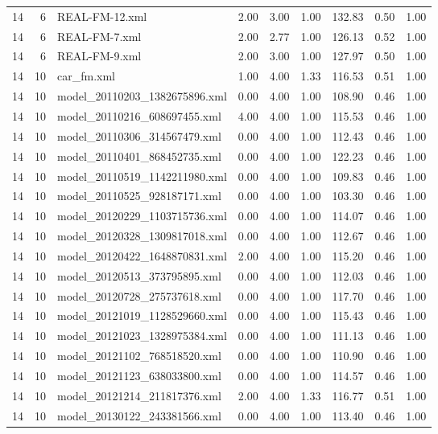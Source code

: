 \begin{table}[ht]
\begin{tabular}{rrlrrrrrr}
   14 &   6 & REAL-FM-12.xml & 2.00 & 3.00 & 1.00 & 132.83 & 0.50 & 1.00 \\ 
   14 &   6 & REAL-FM-7.xml & 2.00 & 2.77 & 1.00 & 126.13 & 0.52 & 1.00 \\ 
   14 &   6 & REAL-FM-9.xml & 2.00 & 3.00 & 1.00 & 127.97 & 0.50 & 1.00 \\ 
   14 &  10 & car\_fm.xml & 1.00 & 4.00 & 1.33 & 116.53 & 0.51 & 1.00 \\ 
   14 &  10 & model\_20110203\_1382675896.xml & 0.00 & 4.00 & 1.00 & 108.90 & 0.46 & 1.00 \\ 
   14 &  10 & model\_20110216\_608697455.xml & 4.00 & 4.00 & 1.00 & 115.53 & 0.46 & 1.00 \\ 
   14 &  10 & model\_20110306\_314567479.xml & 0.00 & 4.00 & 1.00 & 112.43 & 0.46 & 1.00 \\ 
   14 &  10 & model\_20110401\_868452735.xml & 0.00 & 4.00 & 1.00 & 122.23 & 0.46 & 1.00 \\ 
   14 &  10 & model\_20110519\_1142211980.xml & 0.00 & 4.00 & 1.00 & 109.83 & 0.46 & 1.00 \\ 
   14 &  10 & model\_20110525\_928187171.xml & 0.00 & 4.00 & 1.00 & 103.30 & 0.46 & 1.00 \\ 
   14 &  10 & model\_20120229\_1103715736.xml & 0.00 & 4.00 & 1.00 & 114.07 & 0.46 & 1.00 \\ 
   14 &  10 & model\_20120328\_1309817018.xml & 0.00 & 4.00 & 1.00 & 112.67 & 0.46 & 1.00 \\ 
   14 &  10 & model\_20120422\_1648870831.xml & 2.00 & 4.00 & 1.00 & 115.20 & 0.46 & 1.00 \\ 
   14 &  10 & model\_20120513\_373795895.xml & 0.00 & 4.00 & 1.00 & 112.03 & 0.46 & 1.00 \\ 
   14 &  10 & model\_20120728\_275737618.xml & 0.00 & 4.00 & 1.00 & 117.70 & 0.46 & 1.00 \\ 
   14 &  10 & model\_20121019\_1128529660.xml & 0.00 & 4.00 & 1.00 & 115.43 & 0.46 & 1.00 \\ 
   14 &  10 & model\_20121023\_1328975384.xml & 0.00 & 4.00 & 1.00 & 111.13 & 0.46 & 1.00 \\ 
   14 &  10 & model\_20121102\_768518520.xml & 0.00 & 4.00 & 1.00 & 110.90 & 0.46 & 1.00 \\ 
   14 &  10 & model\_20121123\_638033800.xml & 0.00 & 4.00 & 1.00 & 114.57 & 0.46 & 1.00 \\ 
   14 &  10 & model\_20121214\_211817376.xml & 2.00 & 4.00 & 1.33 & 116.77 & 0.51 & 1.00 \\ 
   14 &  10 & model\_20130122\_243381566.xml & 0.00 & 4.00 & 1.00 & 113.40 & 0.46 & 1.00 \\ 

\end{tabular}
\end{table}
